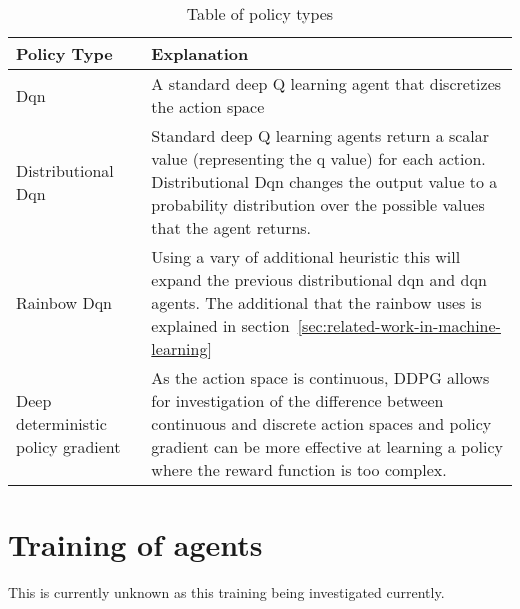 \begin{table}
    \centering
    \begin{tabular}{|p{3cm}|p{12cm}|} \hline
        Policy Type & Explanation \\ \hline
        Dqn~\citep{mnih2015humanlevel} & A standard deep Q learning agent that discretizes the action space \\ \hline
        Distributional Dqn~\citep{distributional_dqn} & Standard deep Q learning agents return a scalar value
            (representing the q value) for each action. Distributional Dqn changes the output value to a probability
            distribution over the possible values that the agent returns. \\ \hline
        Rainbow Dqn~\citep{rainbow} & Using a vary of additional heuristic this will expand the previous distributional
            dqn and dqn agents. The additional that the rainbow uses is explained in
            section~\ref{sec:related-work-in-machine-learning}\\ \hline
        Deep deterministic policy gradient~\citep{ddpg} & As the action space is continuous, DDPG allows for
            investigation of the difference between continuous and discrete action spaces and policy gradient can be
            more effective at learning a policy where the reward function is too complex. \\ \hline
    \end{tabular}
    \caption{Table of policy types}
    \label{tab:reinforcement_learning_policies}
\end{table}


\section{Training of agents}\label{sec:training-of-agents}
This is currently unknown as this training being investigated currently.

